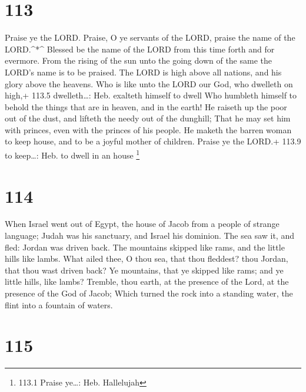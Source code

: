 \hypertarget{section-112}{%
\section{113}\label{section-112}}

 Praise ye the LORD. Praise, O ye servants of the LORD,
praise the name of the LORD.\^{}*\^{}  Blessed be the name
of the LORD from this time forth and for evermore.  From the
rising of the sun unto the going down of the same the LORD's name is to
be praised.  The LORD is high above all nations, and his
glory above the heavens.  Who is like unto the LORD our God,
who dwelleth on high,+ 113.5 dwelleth\ldots: Heb. exalteth himself to
dwell  Who humbleth himself to behold the things that are in
heaven, and in the earth!  He raiseth up the poor out of the
dust, and lifteth the needy out of the dunghill;  That he
may set him with princes, even with the princes of his people.
 He maketh the barren woman to keep house, and to be a
joyful mother of children. Praise ye the LORD.+ 113.9 to keep\ldots:
Heb. to dwell in an house \footnote{113.1 Praise ye\ldots: Heb.
  Hallelujah}

\hypertarget{section-113}{%
\section{114}\label{section-113}}

 When Israel went out of Egypt, the house of Jacob from a
people of strange language;  Judah was his sanctuary, and
Israel his dominion.  The sea saw it, and fled: Jordan was
driven back.  The mountains skipped like rams, and the
little hills like lambs.  What ailed thee, O thou sea, that
thou fleddest? thou Jordan, that thou wast driven back?  Ye
mountains, that ye skipped like rams; and ye little hills, like lambs?
 Tremble, thou earth, at the presence of the Lord, at the
presence of the God of Jacob;  Which turned the rock into a
standing water, the flint into a fountain of waters.

\hypertarget{section-114}{%
\section{115}\label{section-114}}

